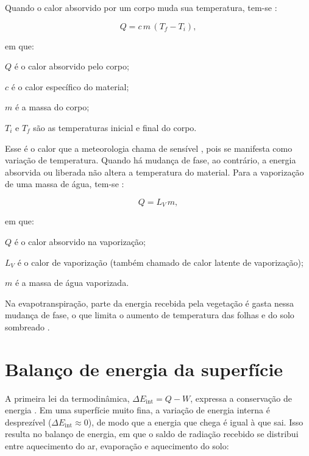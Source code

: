 \documentclass[
12pt,			%
openany,		%
oneside,		%
a4paper,		%
sumario=tradicional,
chapter=TITLE,
section=TITLE,
subsection=Title,
brazil,			%
]{abntex2}
\begin{document}
		
	Quando o calor absorvido por um corpo muda sua temperatura, tem-se \cite{halliday}:
	
	\begin{equation}
		Q = c \, m \, (T_f - T_i),
	\end{equation}
	
	\noindent em que:
	\begin{alineas}
		\item $Q$ é o calor absorvido pelo corpo;
		\item $c$ é o calor específico do material;
		\item $m$ é a massa do corpo;
		\item $T_i$ e $T_f$ são as temperaturas inicial e final do corpo.
	\end{alineas}
	
	Esse é o calor que a meteorologia chama de sensível \cite{atmos}, pois se manifesta como variação de temperatura. Quando há mudança de fase, ao contrário, a energia absorvida ou liberada não altera a temperatura do material. Para a vaporização de uma massa de água, tem-se \cite{halliday}:
	
	\begin{equation}
		Q = L_V \, m,
	\end{equation}
	
	\noindent em que:
	\begin{alineas}
		\item $Q$ é o calor absorvido na vaporização;
		\item $L_V$ é o calor de vaporização (também chamado de calor latente de vaporização);
		\item $m$ é a massa de água vaporizada.
	\end{alineas}
	
	Na evapotranspiração, parte da energia recebida pela vegetação é gasta nessa mudança de fase, o que limita o aumento de temperatura das folhas e do solo sombreado \cite{yang2023}.
	
	
	\section{Balanço de energia da superfície}
	
	A primeira lei da termodinâmica, $\Delta E_{\mathrm{int}} = Q - W$, expressa a conservação de energia \cite{halliday}. Em uma superfície muito fina, a variação de energia interna é desprezível ($\Delta E_{\mathrm{int}} \approx 0$), de modo que a energia que chega é igual à que sai. Isso resulta no balanço de energia, em que o saldo de radiação recebido se distribui entre aquecimento do ar, evaporação e aquecimento do solo:
	
\end{document}
